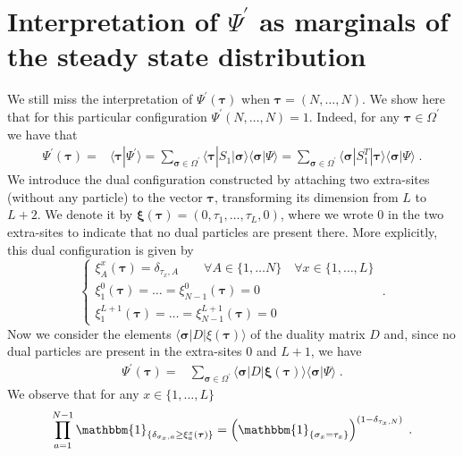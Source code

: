 \documentclass[10pt]{article}
\numberwithin{equation}{section}
\numberwithin{equation}{subsection}
\newcommand{\dt}{\;.}
\begin{document}
\section{Interpretation of $\Psi^{'}$ as marginals of the steady state distribution}\label{subsection-interpretationPSIp} 
We still miss the interpretation of $\Psi^{'}(\bm{\tau})$ when  $\bm{\tau}= (N,\ldots,N)$. We show here that for this particular configuration
$\Psi^{'}(N,\ldots,N) =1$. Indeed, for any $\bm{\tau}\in \Omega^{'}$ we have that 
\begin{align}
	\Psi^{'}(\bm{\tau})=&\langle\bm{\tau}|\Psi^{'}\rangle=\sum_{\bm{\sigma}\in \Omega^{'}}\langle \bm{\tau}|S_{1}|\bm{\sigma}\rangle\langle \bm{\sigma}|\Psi\rangle=\sum_{\bm{\sigma}\in \Omega^{'}}\langle \bm{\sigma}|S_{1}^{T}|\bm{\tau}\rangle\langle \bm{\sigma}|\Psi\rangle\dt
\end{align} 
{\color{black}We introduce the dual configuration constructed by attaching two extra-sites (without any particle) to the vector $\bm{\tau}$, transforming its dimension from $L$ to $L+2$. We denote it by $\bm{\xi}(\bm{\tau})=(0,\tau_{1},\ldots,\tau_{L},0)$, where we wrote $0$ in the two extra-sites to indicate that no dual particles are present there.}  More explicitly, this dual configuration is given by
\begin{equation}
	\begin{cases}
		\xi_{A}^{x}(\bm{\tau})= \delta_{\tau_{x},A}\qquad \forall A\in \{1,\ldots N\}\quad \forall x\in \{1,\ldots,L\}\\
		\xi_{1}^{0}(\bm{\tau})=\ldots=\xi_{N-1}^{0}(\bm{\tau})=0\\
		\xi_{1}^{L+1}(\bm{\tau})=\ldots=\xi_{N-1}^{L+1}(\bm{\tau})=0
	\end{cases}\dt
\end{equation} Now we consider the elements $\langle\bm{\sigma}|D|\xi(\bm{\tau})\rangle$ of the duality matrix $D$ and, {\color{black} since no dual particles are present in the extra-sites $0$ and $L+1$}, we have
\begin{align}\label{useful-InInterpretation}
	\Psi^{'}(\bm{\tau})=&\sum_{\bm{\sigma}\in \Omega^{'}}\langle \bm{\sigma}|D|\bm{\xi}(\bm{\tau})\rangle\langle \bm{\sigma}|\Psi\rangle\dt
\end{align}
We observe that for any $x\in \{1,\ldots,L\}$
\begin{equation}
	\prod_{a=1}^{N-1}\mathbbm{1}_{\{\delta_{\sigma_{x},a}\geq\xi_{a}^{x}(\bm{\tau})\}}=\left(\mathbbm{1}_{\{\sigma_{x}=\tau_{x}\}}\right)^{(1-\delta_{\tau_{x},N})}%
		\dt
\end{equation}
\end{document}
